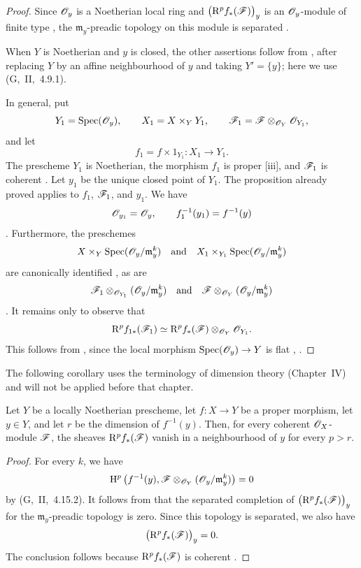 \begin{proof}
Since $\mathscr{O}_y$ is a Noetherian local ring and
$\bigl(\mathrm{R}^p f_*(\mathscr{F})\bigr)_y$ is an $\mathscr{O}_y$-module of finite
type , the $\mathfrak{m}_y$-preadic topology on this
module is separated .

When $Y$ is Noetherian and $y$ is closed, the other assertions follow
from , after replacing $Y$ by an affine neighbourhood
of $y$ and taking $Y'=\{y\}$; here we use (G,~II,~4.9.1).

In general, put
\[
  Y_1=\operatorname{Spec}(\mathscr{O}_y),
  \qquad
  X_1=X\times_Y Y_1,
  \qquad
  \mathscr{F}_1
  =
  \mathscr{F}\otimes_{\mathscr{O}_Y}\mathscr{O}_{Y_1},
\]
and let
\[
  f_1=f\times 1_{Y_1}:X_1\longrightarrow Y_1.
\]
The prescheme $Y_1$ is Noetherian, the morphism $f_1$ is proper
[iii], and $\mathscr{F}_1$ is coherent
.
Let $y_1$ be the unique closed point of $Y_1$.
The proposition already proved applies to $f_1$, $\mathscr{F}_1$, and
$y_1$.
We have
\[
  \mathscr{O}_{y_1}=\mathscr{O}_y,
  \qquad
  f_1^{-1}(y_1)=f^{-1}(y)
\]
.
Furthermore, the preschemes
\[
  X\times_Y\operatorname{Spec}(\mathscr{O}_y/\mathfrak{m}_y^k)
  \quad\text{and}\quad
  X_1\times_{Y_1}\operatorname{Spec}(\mathscr{O}_y/\mathfrak{m}_y^k)
\]
are canonically identified , as are
\[
  \mathscr{F}_1
  \otimes_{\mathscr{O}_{Y_1}}
  (\mathscr{O}_y/\mathfrak{m}_y^k)
  \quad\text{and}\quad
  \mathscr{F}
  \otimes_{\mathscr{O}_Y}
  (\mathscr{O}_y/\mathfrak{m}_y^k)
\]
.
It remains only to observe that
\[
  \mathrm{R}^p f_{1*}(\mathscr{F}_1)
  \simeq
  \mathrm{R}^p f_*(\mathscr{F})
  \otimes_{\mathscr{O}_Y}
  \mathscr{O}_{Y_1}.
\]
This follows from , since the local morphism
$\operatorname{Spec}(\mathscr{O}_y)\to Y$ is flat
, .
\end{proof}

The following corollary uses the terminology of dimension theory
(Chapter~IV) and will not be applied before that chapter.

\begin{corollary}[4.2.2]
\label{III.4.2.2}
Let $Y$ be a locally Noetherian prescheme, let $f:X\to Y$ be a
proper morphism, let $y\in Y$, and let $r$ be the dimension of
$f^{-1}(y)$.
Then, for every coherent $\mathscr{O}_X$-module $\mathscr{F}$, the sheaves
$\mathrm{R}^p f_*(\mathscr{F})$ vanish in a neighbourhood of $y$ for every
$p>r$.
\end{corollary}

\begin{proof}
For every $k$, we have
\[
  \mathrm{H}^p\left(
    f^{-1}(y),
    \mathscr{F}\otimes_{\mathscr{O}_Y}
    (\mathscr{O}_y/\mathfrak{m}_y^k)
  \right)
  =
  0
\]
by (G,~II,~4.15.2).
It follows from  that the separated completion of
$\bigl(\mathrm{R}^p f_*(\mathscr{F})\bigr)_y$ for the
$\mathfrak{m}_y$-preadic topology is zero.
Since this topology is separated, we also have
\[
  \bigl(\mathrm{R}^p f_*(\mathscr{F})\bigr)_y=0.
\]
The conclusion follows because $\mathrm{R}^p f_*(\mathscr{F})$ is coherent
.
\end{proof}

